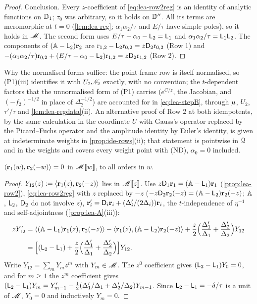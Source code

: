 \begin{proof}
Conclusion. Every $z$-coefficient of \eqref{eq:lea-row2reg} is an identity of analytic functions on $\mathbb{D}_{1}$; $\tau_0$ was arbitrary, so it holds on $\mathbb{D}''$. All its terms are meromorphic at $t = 0$ (\cref{lem:lea-reg}; $\alpha_1\alpha_2/\tau$ and $E/\tau$ have simple poles), so it holds in $\mathscr{M}$. The second form uses $E/\tau-\alpha_0-\mathsf{L}_2 = \mathsf{L}_1$ and $\alpha_1\alpha_2/\tau = \mathsf{L}_1\mathsf{L}_2$. The components of $(\mathbb{A}-\mathsf{L}_2)\mathbf{r}_2$ are $\mathrm{r}_{1,2}-\mathsf{L}_2\mathrm{r}_{0,2} = z\mathsf{D}_2\mathrm{r}_{0,2}$ (Row 1) and $-(\alpha_1\alpha_2/\tau)\mathrm{r}_{0,2} + (E/\tau-\alpha_0-\mathsf{L}_2)\mathrm{r}_{1,2} = z\mathsf{D}_2\mathrm{r}_{1,2}$ (Row 2).
\end{proof}

Why the normalised forms suffice: the point-frame row is itself normalised, so (P1)(iii) identifies it with $U_2\mathscr{N}_{2}$ exactly, with no convention; the $t$-dependent factors that the unnormalised form of (P1) carries ($e^{C/z}$, the Jacobian, and $(-f_2)^{-1/2}$ in place of $\Delta_2^{-1/2}$) are accounted for in \eqref{eq:lea-stepB}, through $\mu$, $U_2$, $\tau'/\tau$ and \cref{lem:lea-regdata}(ii). An alternative proof of Row 2 at both idempotents, by the same calculation in the coordinate $U$ with Gauss's operator replaced by the Picard--Fuchs operator and the amplitude identity by Euler's identity, is given at indeterminate weights in \cref{prop:ide-rows}(ii); that statement is pointwise in $\mathcal{Q}$ and in the weights and covers every weight point with (ND), $\alpha_0 = 0$ included.

\begin{cor}[orthogonality]
\label{cor:lea-orth}
$\langle\mathbf{r}_1(w),\mathbf{r}_2(-w)\rangle = 0$ in $\mathscr{M}[\![ w ]\!]$, to all orders in $w$.
\end{cor}

\begin{proof}
$Y_{12}(z) := \langle\mathbf{r}_1(z),\mathbf{r}_2(-z)\rangle$ lies in $\mathscr{M}[\![ z ]\!]$. Use $z\mathsf{D}_1\mathbf{r}_1 = (\mathbb{A}-\mathsf{L}_1)\mathbf{r}_1$ (\cref{prop:lea-row2}), \eqref{eq:lea-row2reg} with $z$ replaced by $-z$ ($-z\mathsf{D}_2\mathbf{r}_2(-z) = (\mathbb{A}-\mathsf{L}_2)\mathbf{r}_2(-z)$; $\mathbb{A}$, $\mathsf{L}_2$, $\mathsf{D}_2$ do not involve $z$), $\mathbf{r}_i' = \mathsf{D}_i\mathbf{r}_i + (\Delta_i'/(2\Delta_i))\mathbf{r}_i$, the $t$-independence of $\eta^{-1}$ and self-adjointness (\cref{prop:lea-A}(iii)):
\begin{align*}
zY_{12}' &= \langle(\mathbb{A}-\mathsf{L}_1)\mathbf{r}_1(z),\mathbf{r}_2(-z)\rangle - \langle\mathbf{r}_1(z),(\mathbb{A}-\mathsf{L}_2)\mathbf{r}_2(-z)\rangle + \frac{z}{2}\Bigl(\frac{\Delta_1'}{\Delta_1}+\frac{\Delta_2'}{\Delta_2}\Bigr)Y_{12}\\
&= \Bigl[(\mathsf{L}_2-\mathsf{L}_1) + \frac{z}{2}\Bigl(\frac{\Delta_1'}{\Delta_1}+\frac{\Delta_2'}{\Delta_2}\Bigr)\Bigr]Y_{12}.
\end{align*}
Write $Y_{12} = \sum_mY_mz^m$ with $Y_m\in\mathscr{M}$. The $z^0$ coefficient gives $(\mathsf{L}_2-\mathsf{L}_1)Y_0 = 0$, and for $m\geq 1$ the $z^m$ coefficient gives $(\mathsf{L}_2-\mathsf{L}_1)Y_m = Y_{m-1}' - \frac12(\Delta_1'/\Delta_1 + \Delta_2'/\Delta_2)Y_{m-1}$. Since $\mathsf{L}_2-\mathsf{L}_1 = -\delta/\tau$ is a unit of $\mathscr{M}$, $Y_0 = 0$ and inductively $Y_m = 0$.
\end{proof}

